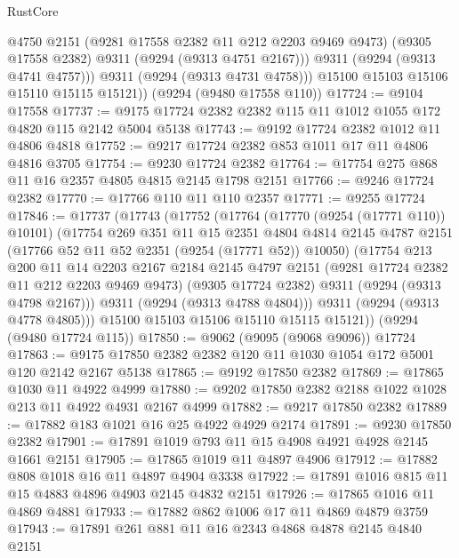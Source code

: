 \begin{lexlean}{RustCore}
\begin{coremodule}
              @4750
              @2151
              (@9281 @17558 @2382 @11 @212 @2203 @9469 @9473)
              (@9305 @17558 @2382)
              @9311
              (@9294 (@9313 @4751 @2167)))
            @9311
            (@9294 (@9313 @4741 @4757)))
          @9311
          (@9294 (@9313 @4731 @4758)))
        @15100
        @15103
        @15106
        @15110
        @15115
        @15121))
    (@9294 (@9480 @17558 @110))
@17724 := @9104 @17558
@17737 := @9175 @17724 @2382 @2382 @115 @11 @1012 @1055 @172 @4820 @115 @2142 @5004 @5138
@17743 := @9192 @17724 @2382 @1012 @11 @4806 @4818
@17752 := @9217 @17724 @2382 @853 @1011 @17 @11 @4806 @4816 @3705
@17754 := @9230 @17724 @2382
@17764 := @17754 @275 @868 @11 @16 @2357 @4805 @4815 @2145 @1798 @2151
@17766 := @9246 @17724 @2382
@17770 := @17766 @110 @11 @110 @2357
@17771 := @9255 @17724
@17846 := @17737
    (@17743
      (@17752
        (@17764
          (@17770 (@9254 (@17771 @110)) @10101)
          (@17754
            @269
            @351
            @11
            @15
            @2351
            @4804
            @4814
            @2145
            @4787
            @2151
            (@17766 @52 @11 @52 @2351 (@9254 (@17771 @52)) @10050)
            (@17754
              @213
              @200
              @11
              @14
              @2203
              @2167
              @2184
              @2145
              @4797
              @2151
              (@9281 @17724 @2382 @11 @212 @2203 @9469 @9473)
              (@9305 @17724 @2382)
              @9311
              (@9294 (@9313 @4798 @2167)))
            @9311
            (@9294 (@9313 @4788 @4804)))
          @9311
          (@9294 (@9313 @4778 @4805)))
        @15100
        @15103
        @15106
        @15110
        @15115
        @15121))
    (@9294 (@9480 @17724 @115))
@17850 := @9062 (@9095 (@9068 @9096)) @17724
@17863 := @9175 @17850 @2382 @2382 @120 @11 @1030 @1054 @172 @5001 @120 @2142 @2167 @5138
@17865 := @9192 @17850 @2382
@17869 := @17865 @1030 @11 @4922 @4999
@17880 := @9202 @17850 @2382 @2188 @1022 @1028 @213 @11 @4922 @4931 @2167 @4999
@17882 := @9217 @17850 @2382
@17889 := @17882 @183 @1021 @16 @25 @4922 @4929 @2174
@17891 := @9230 @17850 @2382
@17901 := @17891 @1019 @793 @11 @15 @4908 @4921 @4928 @2145 @1661 @2151
@17905 := @17865 @1019 @11 @4897 @4906
@17912 := @17882 @808 @1018 @16 @11 @4897 @4904 @3338
@17922 := @17891 @1016 @815 @11 @15 @4883 @4896 @4903 @2145 @4832 @2151
@17926 := @17865 @1016 @11 @4869 @4881
@17933 := @17882 @862 @1006 @17 @11 @4869 @4879 @3759
@17943 := @17891 @261 @881 @11 @16 @2343 @4868 @4878 @2145 @4840 @2151

\end{coremodule}
\end{lexlean}
